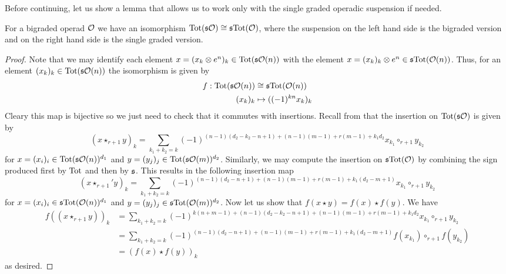 \documentclass[join.tex]{subfiles}
\begin{document}
Before continuing, let us show a lemma that allows us to work only with the single graded operadic suspension if needed.
\begin{propo}\label{extrasign}
For a bigraded operad ${\mathcal O}$ we have an isomorphism $\mathrm{Tot}(\mathfrak{s}{\mathcal O})\cong \mathfrak{s} \mathrm{Tot}({\mathcal O})$, where the suspension on the left hand side is the bigraded version and on the right hand side is the single graded version. 
\end{propo}
\begin{proof}
 Note that we may identify each element $x=(x_k\otimes e^n )_k\in\mathrm{Tot}(\mathfrak{s}{\mathcal O}(n))$ with the element $x=(x_k)_k\otimes e^n\in\mathfrak{s}\mathrm{Tot}({\mathcal O}(n))$. Thus, for an element $(x_k)_k\in \mathrm{Tot}(\mathfrak{s}{\mathcal O}(n))$ the isomorphism is given by
\begin{align*}
f:\mathrm{Tot}(\mathfrak{s}{\mathcal O}(n))&\cong \mathfrak{s} \mathrm{Tot}({\mathcal O}(n))\\
(x_k)_k&\mapsto ((-1)^{kn}x_k)_k
\end{align*}
Cleary this map is bijective so we just need to check that it commutes with insertions. Recall from  that the insertion on $\mathrm{Tot}(\mathfrak{s}{\mathcal O})$ is given by
\begin{equation*}
(x\star_{r+1} y)_k=\sum_{k_1+k_2=k}(-1)^{(n-1)(d_2-k_2-n+1)+(n-1)(m-1)+r(m-1)+k_1d_2}x_{k_1}\circ_{r+1}y_{k_2}
\end{equation*}
for $x=(x_i)_i\in \mathrm{Tot}(\mathfrak{s}{\mathcal O}(n))^{d_1}$ and $y=(y_j)_j\in \mathrm{Tot}(\mathfrak{s}{\mathcal O}(m))^{d_2}$. Similarly, we may compute the insertion on $\mathfrak{s}\mathrm{Tot}({\mathcal O})$ by combining the sign produced first by $\mathrm{Tot}$ and then by $\mathfrak{s}$. This results in  the following insertion map 
\begin{equation*}
(x\star_{r+1}' y)_k=\sum_{k_1+k_2=k}(-1)^{(n-1)(d_2-n+1)+(n-1)(m-1)+r(m-1)+k_1(d_2-m+1)}x_{k_1}\circ_{r+1}y_{k_2}
\end{equation*}
for $x=(x_i)_i\in \mathfrak{s}\mathrm{Tot}({\mathcal O}(n))^{d_1}$ and $y=(y_j)_j\in \mathfrak{s}\mathrm{Tot}({\mathcal O}(m))^{d_2}$. Now let us show that $f(x\star y)=f(x)\star f(y)$. We have
\begin{align*}
f((x\star_{r+1} y))_k&=\sum_{k_1+k_2=k}(-1)^{k(n+m-1)+(n-1)(d_2-k_2-n+1)+(n-1)(m-1)+r(m-1)+k_1d_2}x_{k_1}\circ_{r+1}y_{k_2}\\
&=\sum_{k_1+k_2=k}(-1)^{(n-1)(d_2-n+1)+(n-1)(m-1)+r(m-1)+k_1(d_2-m+1)}f(x_{k_1})\circ_{r+1}f(y_{k_2})\\
&=(f(x)\star f(y))_k
\end{align*}
as desired.
\end{proof}
\end{document}
